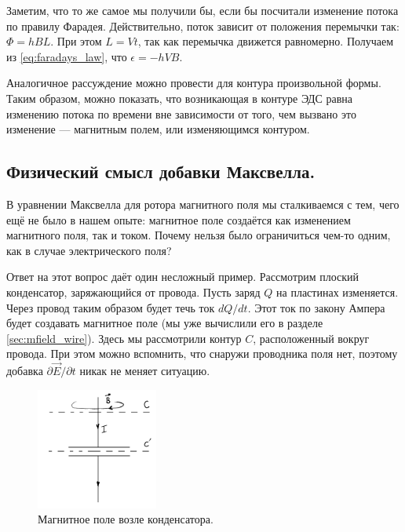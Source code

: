 \documentclass[11pt,a4paper]{article}
\numberwithin{equation}{section}
\newcommand{\pt}{\partial}
\newcommand{\eps}{\epsilon}
\begin{document}
Заметим, что то же самое мы получили бы, если бы посчитали изменение
потока по правилу Фарадея. Действительно, поток зависит от положения
перемычки так: $\Phi = h B L$. При этом $L=Vt$, так как перемычка
движется равномерно. Получаем из \eqref{eq:faradays_law}, что $\eps =
-h VB$.

Аналогичное рассуждение можно провести для контура произвольной
формы. Таким образом, можно показать, что возникающая в контуре ЭДС
равна изменению потока по времени вне зависимости от того, чем вызвано
это изменение --- магнитным полем, или изменяющимся контуром. 

\subsection{Физический смысл добавки Максвелла. }
\label{sec:physical_sense_maxwell}

В уравнении Максвелла для ротора магнитного поля мы сталкиваемся с
тем, чего ещё не было в нашем опыте: магнитное поле создаётся как
изменением магнитного поля, так и током. Почему нельзя было
ограничиться чем-то одним, как в случае электрического поля? 

Ответ на этот вопрос даёт один несложный пример. Рассмотрим плоский
конденсатор, заряжающийся от провода. Пусть заряд $Q$ на пластинах
изменяется. Через провод таким образом будет течь ток $dQ/dt$. Этот
ток по закону Ампера будет создавать магнитное поле (мы уже вычислили
его в разделе \ref{sec:mfield_wire}). Здесь мы рассмотрили контур $C$,
расположенный вокруг провода. При этом можно вспомнить, что снаружи
проводника поля нет, поэтому добавка $\pt \vec{E}/\pt t$ никак не
меняет ситуацию.

\begin{figure}
  \vspace{-1cm}
  \begin{center}
  \includegraphics[width=4cm]{displacement.pdf}  
  \end{center}
  \vspace{-1cm}
  \caption{Магнитное поле возле конденсатора.}
  \label{fig:displacement}
\end{figure}
\end{document}
